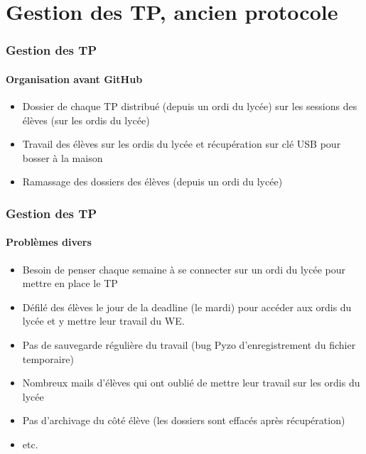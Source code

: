 \section{Gestion des TP, ancien protocole}

\begin{frame}
	\frametitle{Gestion des TP}
	\framesubtitle{Organisation avant GitHub}

	\begin{itemize}[<+->]
		\item	 Dossier de chaque TP distribué (depuis un ordi du lycée) sur les sessions des élèves (sur les ordis du lycée)

		\item  Travail des élèves sur les ordis du lycée et récupération sur clé USB pour bosser à la maison

		\item Ramassage des dossiers des élèves (depuis un ordi du lycée)

	\end{itemize}

\end{frame}


\begin{frame}
	\frametitle{Gestion des TP}
	\framesubtitle{Problèmes divers}

	\begin{itemize}[<+->]
		\item Besoin de penser chaque semaine à se connecter sur un ordi du lycée pour mettre en place le TP

		\item Défilé des élèves le jour de la deadline (le mardi) pour accéder aux ordis du lycée et y mettre leur travail du WE.

		\item Pas de sauvegarde régulière du travail (bug Pyzo d'enregistrement du fichier temporaire)

		\item Nombreux mails d'élèves qui ont oublié de mettre leur travail sur les ordis du lycée

		\item Pas d'archivage du côté élève (les dossiers sont effacés après récupération)

		\item etc.

	\end{itemize}

\end{frame}

